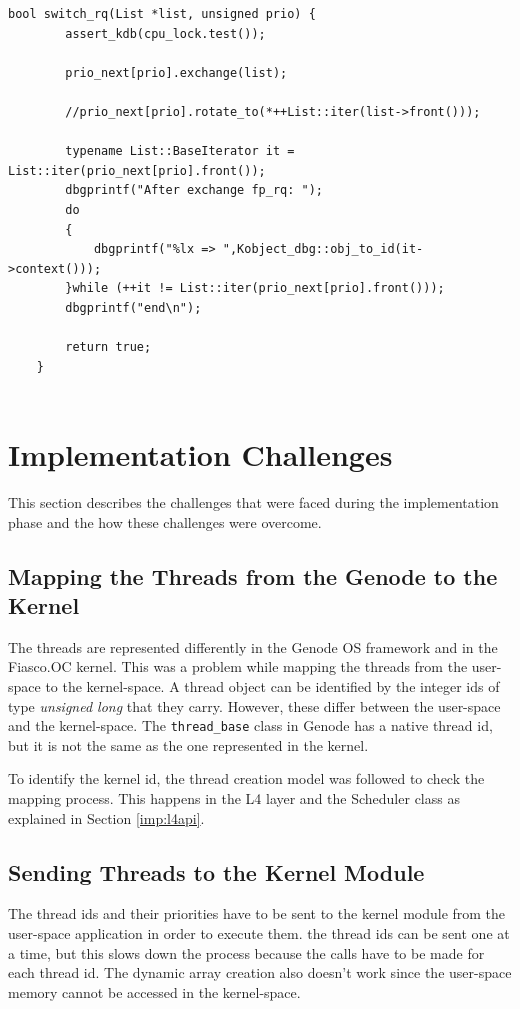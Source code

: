  \begin{lstlisting}[caption={Exchanging the ready queue},label=rq_exchange, style=customcpp]
 bool switch_rq(List *list, unsigned prio) {
   		assert_kdb(cpu_lock.test());
 
   		prio_next[prio].exchange(list);
 
   		//prio_next[prio].rotate_to(*++List::iter(list->front()));
 
   		typename List::BaseIterator it = List::iter(prio_next[prio].front());
   		dbgprintf("After exchange fp_rq: ");
   		do
   		{
   			dbgprintf("%lx => ",Kobject_dbg::obj_to_id(it->context()));
   		}while (++it != List::iter(prio_next[prio].front()));
   		dbgprintf("end\n");
 
   		return true;
   	}
 
\end{lstlisting}

\section{Implementation Challenges}
This section describes the challenges that were faced during the implementation phase and the how these challenges were overcome.

\subsection{Mapping the Threads from the Genode to the Kernel}
The threads are represented differently in the Genode OS framework and in the Fiasco.OC kernel. This was a problem while mapping the threads from the user-space to the kernel-space. A thread object can be identified by the integer ids of type \textit{unsigned long} that they carry. However, these differ between the user-space and the kernel-space. The \texttt{thread\_base} class in Genode has a native thread id, but it is not the same as the one represented in the kernel.

To identify the kernel id, the thread creation model was followed to check the mapping process. This happens in the L4 layer and the Scheduler class as explained in Section \ref{imp:l4api}.


\subsection{Sending Threads to the Kernel Module}
The thread ids and their priorities have to be sent to the kernel module from the user-space application in order to execute them. the thread ids can be sent one at a time, but this slows down the process because the calls have to be made for each thread id. The dynamic array creation also doesn't work since the user-space memory cannot be accessed in the kernel-space. 


